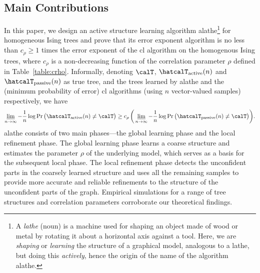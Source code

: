 \documentclass[11pt,onecolumn]{article}
\newcommand{\Passive}{{\rm passive}}
\newcommand{\Active}{{\rm active}}
\begin{document}
\renewcommand{\thefootnote}{\arabic{footnote}}
\subsection{Main Contributions}
In this paper, we design an active structure learning algorithm \ac{alathe}\footnote{A \emph{lathe} (noun) is a machine used for shaping an object made of wood or metal by   rotating it about a horizontal axis against a tool. Here,  we are  {\em shaping} or {\em learning}  the structure of a graphical model, analogous to  a lathe, but doing this {\em actively}, hence the origin of the name of the algorithm \ac{alathe}.} for homogeneous Ising trees and prove that its error exponent   algorithm is no less than $c_{\rho}\geq 1$ times the error exponent of the \ac{cl} algorithm on the homogenous Ising trees, where $c_{\rho}$ is a non-decreasing function of the correlation parameter $\rho$ defined in Table~\ref{table:crho}. Informally, denoting $\calT$, $\hatcalT_{\Active}(n)$ and $\hatcalT_{\Passive}(n)$ as true tree, and  the trees learned by \ac{alathe} and the (minimum probability of error) \ac{cl} algorithms (using $n$ vector-valued samples) respectively,  we have
\begin{equation}
    \varliminf_{n\rightarrow \infty}-\frac{1}{n}\log \Pr \big(\hatcalT_{\Active}(n)\neq \calT\big)\ge c_\rho\,\bigg( \varliminf_{n\rightarrow \infty}-\frac{1}{n}\log \Pr \big(\hatcalT_{\Passive}(n)\neq \calT\big)\bigg).
\end{equation}
\ac{alathe} consists of two main phases---the global learning phase and the local refinement phase. The global learning phase learns a coarse structure and estimates the parameter $\rho$ of the underlying model, which serves as a basis for the 
subsequent local phase. The local refinement phase detects the unconfident parts in the coarsely learned structure and uses all the remaining samples to provide more accurate and reliable refinements to the structure of the unconfident parts of the graph.  Empirical simulations for a range of tree structures and correlation parameters corroborate our theoretical findings. 
\end{document}
